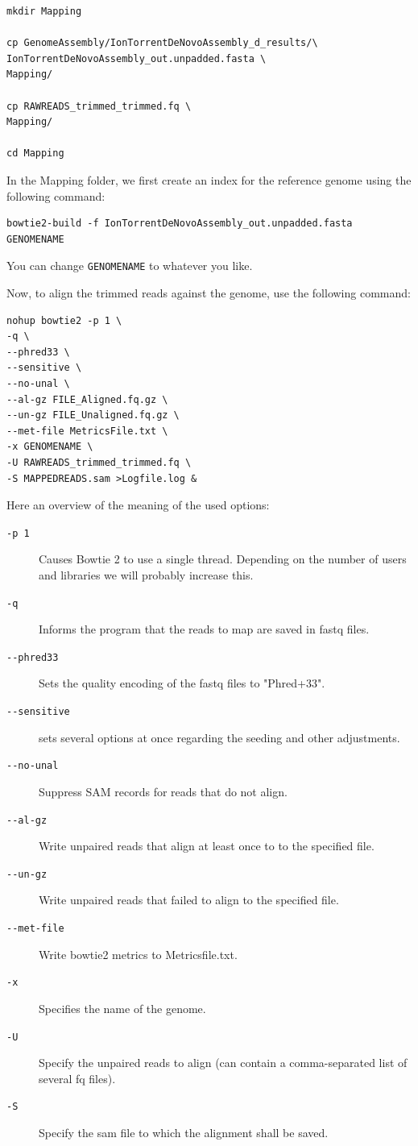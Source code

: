 \documentclass[11pt]{article}
\begin{document}
\begin{verbatim}
mkdir Mapping

cp GenomeAssembly/IonTorrentDeNovoAssembly_d_results/\
IonTorrentDeNovoAssembly_out.unpadded.fasta \
Mapping/

cp RAWREADS_trimmed_trimmed.fq \
Mapping/

cd Mapping
\end{verbatim}


In the Mapping folder, we first create an index for the reference genome using the
following command:

\begin{verbatim}
bowtie2-build -f IonTorrentDeNovoAssembly_out.unpadded.fasta GENOMENAME
\end{verbatim}

You can change \texttt{GENOMENAME} to whatever you like.

Now, to align the trimmed reads against the genome, use the following command:

\begin{verbatim}
nohup bowtie2 -p 1 \
-q \
--phred33 \
--sensitive \
--no-unal \
--al-gz FILE_Aligned.fq.gz \
--un-gz FILE_Unaligned.fq.gz \
--met-file MetricsFile.txt \
-x GENOMENAME \
-U RAWREADS_trimmed_trimmed.fq \
-S MAPPEDREADS.sam >Logfile.log &
\end{verbatim}

Here an overview of the meaning of the used options:


\begin{description}
\item[{\texttt{-p 1}}] Causes Bowtie 2 to use a single thread.
Depending on the number of users and libraries we will  probably increase this.
\item[{\texttt{-q}}] Informs the program that the reads to map are saved in fastq files.
\item[{\texttt{-{}-phred33}}] Sets the quality encoding of the fastq files to  "Phred+33".
\item[{\texttt{-{}-sensitive}}] sets several options at once regarding the seeding and other adjustments.
\item[{\texttt{-{}-no-unal}}] Suppress SAM records for reads that do not align.
\item[{\texttt{-{}-al-gz}}] Write unpaired reads that align at least once to to the specified file.
\item[{\texttt{-{}-un-gz}}] Write unpaired reads that failed to align to the specified file.
\item[{\texttt{-{}-met-file}}] Write bowtie2 metrics to Metricsfile.txt.
\item[{\texttt{-x}}] Specifies the name of the genome.
\item[{\texttt{-U}}] Specify the unpaired reads to align (can contain a comma-separated list of several fq files).
\item[{\texttt{-S}}] Specify the sam file to which the alignment shall be saved.
\end{description}
\end{document}
